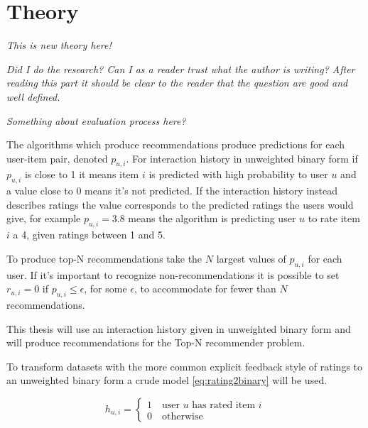 \chapter{Theory}\label{cha:theory}

\textit{This is new theory here!}

\textit{Did I do the research? Can I as a reader trust what the author is writing? After reading this part it should be clear to the reader that the question are good and well defined.}

\textit{Something about evaluation process here?}

The algorithms which produce recommendations produce predictions for each user-item pair, denoted $p_{u, i}$. For interaction history in unweighted binary form if $p_{u, i}$ is close to 1 it means item $i$ is predicted with high probability to user $u$ and a value close to 0 means it's not predicted. If the interaction history instead describes ratings the value corresponds to the predicted ratings the users would give, for example $p_{u, i} = 3.8$ means the algorithm is predicting user $u$ to rate item $i$ a 4, given ratings between 1 and 5.

To produce top-N recommendations take the $N$ largest values of $p_{u, i}$ for each user. If it's important to recognize non-recommendations it is possible to set $r_{u, i} = 0$ if $p_{u, i} \leq \epsilon$, for some $\epsilon$, to accommodate for fewer than $N$ recommendations.

This thesis will use an interaction history given in unweighted binary form and will produce recommendations for the Top-N recommender problem.

To transform datasets with the more common explicit feedback style of ratings to an unweighted binary form a crude model \eqref{eq:rating2binary} will be used.

\begin{equation} \label{eq:rating2binary}
    h_{u, i} = \begin{cases}
        1 \quad \text{user $u$ has rated item $i$} \\
        0 \quad \text{otherwise}
    \end{cases}
\end{equation}

